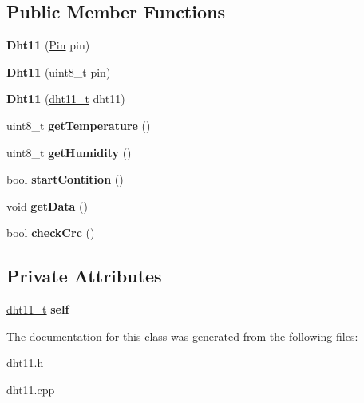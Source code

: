 \subsection*{Public Member Functions}
\begin{DoxyCompactItemize}
\item 
\mbox{\label{classDht11_a2d28c64f9f68880b48c787fe8be65e82}} 
{\bfseries Dht11} (\mbox{\hyperlink{classPin}{Pin}} pin)
\item 
\mbox{\label{classDht11_aca67610ae8e6e7a2f1df449295944b12}} 
{\bfseries Dht11} (uint8\+\_\+t pin)
\item 
\mbox{\label{classDht11_af3721521ff45bfbbe0a6b2ff3801d511}} 
{\bfseries Dht11} (\mbox{\hyperlink{structdht11__t}{dht11\+\_\+t}} dht11)
\item 
\mbox{\label{classDht11_a0959ad424980bf0386e132b66cbade5c}} 
uint8\+\_\+t {\bfseries get\+Temperature} ()
\item 
\mbox{\label{classDht11_a7edaa36ffa969932f7522a92d4ebbc21}} 
uint8\+\_\+t {\bfseries get\+Humidity} ()
\item 
\mbox{\label{classDht11_a2e70616b1c70d2dc6937e38c6cef27de}} 
bool {\bfseries start\+Contition} ()
\item 
\mbox{\label{classDht11_ad4cb519c841e97b5d1464e1fb66b332f}} 
void {\bfseries get\+Data} ()
\item 
\mbox{\label{classDht11_aded72886f2b8eed116d027ac47227046}} 
bool {\bfseries check\+Crc} ()
\end{DoxyCompactItemize}
\subsection*{Private Attributes}
\begin{DoxyCompactItemize}
\item 
\mbox{\label{classDht11_ad12915cbf961e219ef06dc617389ca51}} 
\mbox{\hyperlink{structdht11__t}{dht11\+\_\+t}} {\bfseries self}
\end{DoxyCompactItemize}


The documentation for this class was generated from the following files\+:\begin{DoxyCompactItemize}
\item 
dht11.\+h\item 
dht11.\+cpp\end{DoxyCompactItemize}
